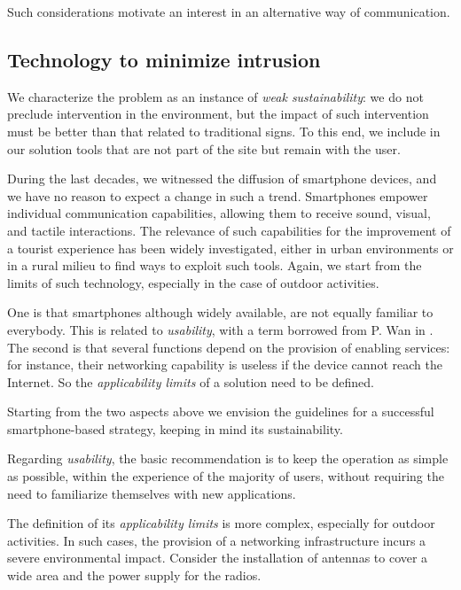 \documentclass[sustainability,article,submit,pdftex,moreauthors]{Definitions/mdpi}
\begin{document}
Such considerations motivate an interest in an alternative way of communication.

\subsection{Technology to minimize intrusion \label{sec:minimize}}

We characterize the problem as an instance of {\em weak sustainability}: we do not preclude intervention in the environment, but the impact of such intervention must be better than that related to traditional signs. To this end, we include in our solution tools that are not part of the site but remain with the user.   

During the last decades, we witnessed the diffusion of smartphone devices, and we have no reason to expect a change in such a trend. Smartphones empower individual communication capabilities, allowing them to receive sound, visual, and tactile interactions. The relevance of such capabilities for the improvement of a tourist experience has been widely investigated, either in urban environments \cite{liu16a} or in a rural milieu \cite{kum20a} to find ways to exploit such tools. Again, we start from the limits of such technology, especially in the case of outdoor activities.

One is that smartphones although widely available, are not equally familiar to everybody. This is related to {\em usability}, with a term borrowed from P. Wan in \cite{wan22a}. The second is that several functions depend on the provision of enabling services: for instance, their networking capability is useless if the device cannot reach the Internet. So the {\em applicability limits} of a solution need to be defined.

Starting from the two aspects above we envision the guidelines for a successful smartphone-based strategy, keeping in mind its sustainability.

Regarding {\em usability}, the basic recommendation is to keep the operation as simple as possible, within the experience of the majority of users, without requiring the need to familiarize themselves with new applications.

The definition of its {\em applicability limits} is more complex, especially for outdoor activities. In such cases, the provision of a networking infrastructure incurs a severe environmental impact. Consider the installation of antennas to cover a wide area and the power supply for the radios. 
\end{document}
